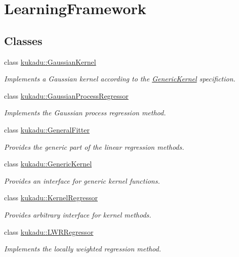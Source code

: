 \hypertarget{group__LearningFramework}{\section{Learning\-Framework}
\label{group__LearningFramework}
}
\subsection*{Classes}
\begin{DoxyCompactItemize}
\item 
class \hyperlink{classkukadu_1_1GaussianKernel}{kukadu\-::\-Gaussian\-Kernel}
\begin{DoxyCompactList}\small\item\em Implements a Gaussian kernel according to the \hyperlink{classkukadu_1_1GenericKernel}{Generic\-Kernel} specifiction. \end{DoxyCompactList}\item 
class \hyperlink{classkukadu_1_1GaussianProcessRegressor}{kukadu\-::\-Gaussian\-Process\-Regressor}
\begin{DoxyCompactList}\small\item\em Implements the Gaussian process regression method. \end{DoxyCompactList}\item 
class \hyperlink{classkukadu_1_1GeneralFitter}{kukadu\-::\-General\-Fitter}
\begin{DoxyCompactList}\small\item\em Provides the generic part of the linear regression methods. \end{DoxyCompactList}\item 
class \hyperlink{classkukadu_1_1GenericKernel}{kukadu\-::\-Generic\-Kernel}
\begin{DoxyCompactList}\small\item\em Provides an interface for generic kernel functions. \end{DoxyCompactList}\item 
class \hyperlink{classkukadu_1_1KernelRegressor}{kukadu\-::\-Kernel\-Regressor}
\begin{DoxyCompactList}\small\item\em Provides arbitrary interface for kernel methods. \end{DoxyCompactList}\item 
class \hyperlink{classkukadu_1_1LWRRegressor}{kukadu\-::\-L\-W\-R\-Regressor}
\begin{DoxyCompactList}\small\item\em Implements the locally weighted regression method. \end{DoxyCompactList}\item 

\end{DoxyCompactItemize}
